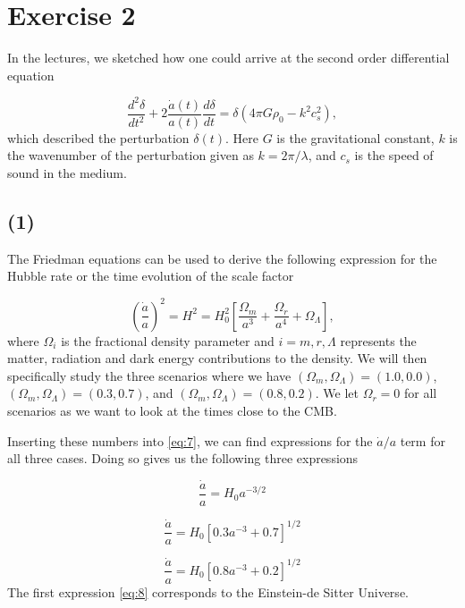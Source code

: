 \documentclass[a4paper]{article}
\begin{document}
\section*{Exercise 2}
In the lectures, we sketched how one could arrive at the second order differential equation 

\begin{equation}
\frac{d^2 \delta}{dt^2} + 2 \frac{\dot{a}(t)}{a(t)} \frac{d \delta}{dt} = \delta(4 \pi G \rho_0 - k^2 c_s^2),
\end{equation}
which described the perturbation $\delta(t)$. Here $G$ is the gravitational constant, $k$ is the wavenumber of the perturbation given as $k = 2\pi/ \lambda$, and $c_s$ is the speed of sound in the medium.
\subsection*{(1)}

The Friedman equations can be used to derive the following expression for the Hubble rate or the time evolution of the scale factor 

\begin{equation}
\left(\frac{\dot{a}}{a}\right)^2 = H^2 = H_0^2 \left[ \frac{\Omega_m}{a^3} + \frac{\Omega_r}{a^4} + \Omega_\Lambda \right],
\end{equation}
where $\Omega_i$ is the fractional density parameter and
$i = m,r, \Lambda$ represents the matter, radiation and dark energy contributions to the density. We will then specifically study the three scenarios where we have  $(\Omega_m, \Omega_\Lambda) = (1.0, 0.0)$, $(\Omega_m, \Omega_\Lambda) = (0.3, 0.7)$, and $(\Omega_m, \Omega_\Lambda) = (0.8, 0.2)$. We let $\Omega_r = 0$ for all scenarios as we want to look at the times close to the CMB.

Inserting these numbers into \eqref{eq:7}, we can find expressions for the $\dot{a}/a$ term for all three cases. Doing so gives us the following three expressions

\begin{equation}
\frac{\dot{a}}{a} = H_0 a^{-3/2}
\end{equation}

\begin{equation}
\frac{\dot{a}}{a} = H_0 \left[0.3a^{-3} + 0.7\right]^{1/2}
\end{equation}

\begin{equation}
\frac{\dot{a}}{a} = H_0  \left[0.8a^{-3} + 0.2\right]^{1/2}
\end{equation}
The first expression \eqref{eq:8} corresponds to the Einstein-de Sitter Universe.
\end{document}
